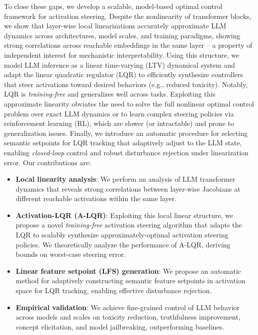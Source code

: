 \documentclass{article}
\theoremstyle{plain}
\theoremstyle{definition}
\theoremstyle{remark}
\begin{document}
To close these gaps, we develop a scalable, model-based optimal control framework for activation steering. Despite the nonlinearity of transformer blocks, we show that layer-wise local linearizations accurately approximate LLM dynamics across architectures, model scales, and training paradigms, showing strong correlations across reachable embeddings in the same layer -- a property of independent interest for mechanistic interpretability. Using this structure, we model LLM inference as a linear time-varying (LTV) dynamical system and adapt the linear quadratic regulator (LQR) \cite{kalman1960contributions} to efficiently synthesize controllers that steer activations toward desired behaviors (e.g., reduced toxicity). Notably, LQR is \textit{training-free} and generalizes well across tasks. Exploiting this approximate linearity obviates the need to solve the full nonlinear optimal control problem over exact LLM dynamics or to learn complex steering policies via reinforcement learning (RL), which are slower (or intractable) and prone to generalization issues. Finally, we introduce an automatic procedure for selecting semantic setpoints for LQR tracking that adaptively adjust to the LLM state, enabling \textit{closed-loop} control and robust disturbance rejection under linearization error. Our contributions are:

\vspace{-9pt}
\begin{itemize}[noitemsep]
    \item \textbf{Local linearity analysis}: We perform an analysis of LLM transformer dynamics that reveals strong correlations between layer-wise Jacobians at different reachable activations within the same layer.
    \item \textbf{Activation-LQR (A-LQR)}: Exploiting this local linear structure, we propose a novel \textit{training-free} activation steering algorithm that adapts the LQR to scalably synthesize approximately-optimal activation steering policies. We theoretically analyze the performance of A-LQR, deriving bounds on worst-case steering error.
    \item \textbf{Linear feature setpoint (LFS) generation}: We propose an automatic method for adaptively constructing semantic feature setpoints in activation space for LQR tracking, enabling effective disturbance rejection.
    \item \textbf{Empirical validation}: We achieve fine-grained control of LLM behavior across models and scales on toxicity reduction, truthfulness improvement, concept elicitation, and model jailbreaking, outperforming baselines.
\end{itemize}
\end{document}
